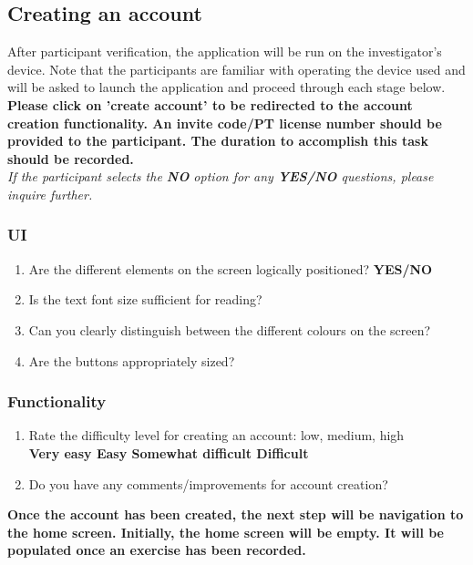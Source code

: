 \documentclass[12pt, titlepage]{article}
\begin{document}
\subsection{Creating an account} 
After participant verification, the application will be run on the investigator's device. Note that the participants 
are familiar with operating the device used and will be asked to launch the application and
proceed through each stage below. \\

\noindent \textbf{Please click on 'create account' to be redirected to the account creation functionality. An invite code/PT license 
number should be provided to the participant. The duration to accomplish this task should be recorded.}\\ 
\textit{If the participant selects the \textbf{NO} option for any \textbf{YES/NO} questions, please inquire further.} 

\subsubsection{UI}
\begin{enumerate}
    \item Are the different elements on the screen logically positioned? \textbf{YES/NO} 
    \item Is the text font size sufficient for reading?
    \item Can you clearly distinguish between the different colours on the screen?
    \item Are the buttons appropriately sized?
\end{enumerate}

\subsubsection{Functionality}
\begin{enumerate}
    \item Rate the difficulty level for creating an account: low, medium, high
    \\\textbf{Very easy \qquad Easy \qquad Somewhat difficult \qquad Difficult}
    \item Do you have any comments/improvements for account creation?
\end{enumerate}
\textbf{Once the account has been created, the next step will be navigation to the home screen. 
Initially, the home screen will be empty. It will be populated once an exercise has been recorded.}
\end{document}
